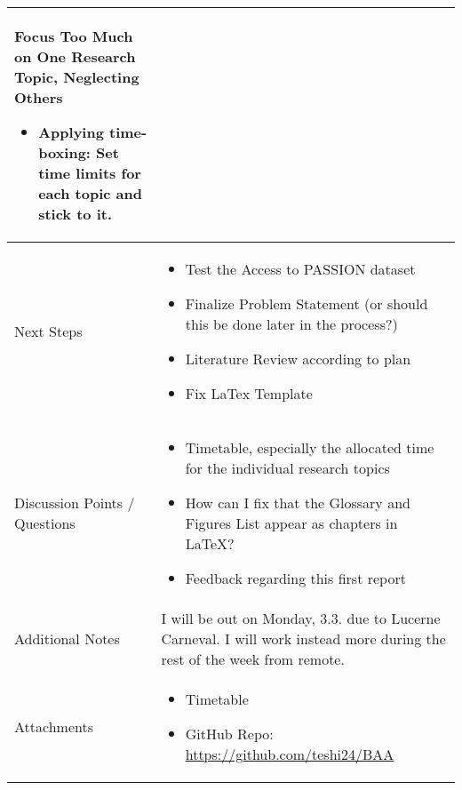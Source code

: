 \documentclass[a4paper,11pt]{article}
\begin{document}
\begin{longtable}{|p{4cm}|p{10cm}|}
		Focus Too Much on One Research Topic, Neglecting Others
		\begin{itemize}
			\item Applying time-boxing: Set time limits for each topic and stick to it.
		\end{itemize} \\
		
		\hline
		Next Steps & \begin{itemize}
			\item Test the Access to PASSION dataset
			\item Finalize Problem Statement (or should this be done later in the process?)
			\item Literature Review according to plan
			\item Fix LaTex Template
		\end{itemize} \\
		\hline
		Discussion Points / Questions & \begin{itemize}
			\item Timetable, especially the allocated time for the individual research topics
			\item How can I fix that the Glossary and Figures List appear as chapters in LaTeX?
			\item Feedback regarding this first report
		\end{itemize} \\
		\hline
		Additional Notes & I will be out on Monday, 3.3. due to Lucerne Carneval. I will work instead more during the rest of the week from remote. \\
		\hline
		Attachments  & \begin{itemize}
			\item Timetable
			\item GitHub Repo: \href{https://github.com/teshi24/BAA}{https://github.com/teshi24/BAA}
		\end{itemize} \\
		\hline
	\end{longtable}
	
\end{document}
